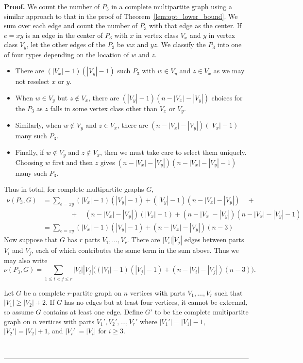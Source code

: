 \documentclass[12pt]{article}
\renewenvironment{proof}[1][Proof]{\textbf{#1.} }{\ \rule{0.5em}{0.5em}}
\begin{document}
\begin{proof}
We count the number of $P_3$ in a complete multipartite graph using a similar
approach to that in the proof of Theorem~\ref{lem:opt_lower_bound}. We sum over
each edge and count the number of $P_3$ with that edge as the center. If $e =
xy$ is an edge in the center of $P_3$ with $x$ in vertex class $V_x$ and $y$ in
vertex class $V_y$, let the other edges of the $P_3$ be $wx$ and $yz$. We
classify the $P_3$ into one of four types depending on the location of $w$ and
$z$.
\begin{itemize}
\item There are $(|V_x|-1)(|V_y|-1)$ such $P_3$ with $w \in V_y$ and $z \in
V_x$ as we may not reselect $x$ or $y$.
\item When $w \in V_y$ but $z \notin V_x$, there are $(|V_y|-1)(n-|V_x|-|V_y|)$
choices for the $P_3$ as $z$ falls in some vertex class other than $V_x$ or
$V_y$.
\item Similarly, when $w \notin V_y$ and $z \in V_x$, there are
$(n-|V_x|-|V_y|)(|V_x|-1)$ many such $P_3$.
\item Finally, if $w \notin V_y$ and $z \notin V_x$, then we must take care to
select them uniquely.  Choosing $w$ first and then $z$ gives
$(n-|V_x|-|V_y|)(n-|V_x|-|V_y|-1)$ many such $P_3$.
\end{itemize}
Thus in total, for complete multipartite graphs $G$,
\begin{align*}
\nu(P_3,G) &= \sum_{e=xy} (|V_x|-1)(|V_y|-1) + (|V_y|-1)(n-|V_x|-|V_y|) \quad +\\
	&\qquad\qquad+\quad(n-|V_x|-|V_y|)(|V_x|-1) + (n-|V_x|-|V_y|)(n-|V_x|-|V_y|-1)\\
	&= \sum_{e=xy} (|V_x|-1)(|V_y|-1) + (n-|V_x|-|V_y|)(n-3)
\end{align*}
Now suppose that $G$ has $r$ parts $V_1, \ldots, V_r$. There are $|V_i||V_j|$
edges between parts $V_i$ and $V_j$, each of which contributes the same term in
the sum above. Thus we may also write
\begin{equation}\label{eq:multipartite_p3_count}
\nu(P_3,G) = \sum_{1 \le i < j \le r}|V_i||V_j|\bigl((|V_i|-1)(|V_j|-1) + (n-|V_i|-|V_j|)(n-3)\bigr).
\end{equation}

Let $G$ be a complete $r$-partite graph on $n$ vertices with parts $V_1,
\ldots, V_r$ such that $|V_1| \ge |V_2|+2$. If $G$ has no edges but at least
four vertices, it cannot be extremal, so assume $G$ contains at least one edge.
Define $G'$ to be the complete multipartite graph on $n$ vertices with parts
$V_1', V_2', \ldots, V_r'$ where $|V_1'| = |V_1|-1$, $|V_2'| = |V_2|+1$, and
$|V_i'| = |V_i|$ for $i \ge 3$.


\end{proof}
\end{document}

